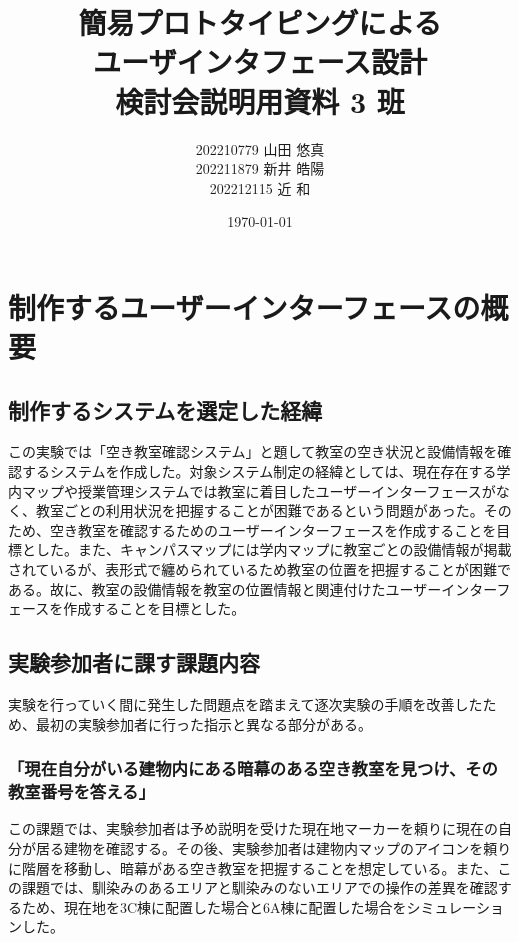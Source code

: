 \documentclass[12pt,a4paper,dvipdf]{jsarticle}
\title{簡易プロトタイピングによる\\ユーザインタフェース設計\\検討会説明用資料 3 班}
\author{202210779 山田 悠真\\202211879 新井 皓陽\\202212115 近 和}
\date{\today}
\begin{document}
\maketitle
\newpage


\section{制作するユーザーインターフェースの概要}
\subsection{制作するシステムを選定した経緯}
この実験では「空き教室確認システム」と題して教室の空き状況と設備情報を確認するシステムを作成した。対象システム制定の経緯としては、現在存在する学内マップや授業管理システムでは教室に着目したユーザーインターフェースがなく、教室ごとの利用状況を把握することが困難であるという問題があった。そのため、空き教室を確認するためのユーザーインターフェースを作成することを目標とした。また、キャンパスマップには学内マップに教室ごとの設備情報が掲載されているが、表形式で纏められているため教室の位置を把握することが困難である。故に、教室の設備情報を教室の位置情報と関連付けたユーザーインターフェースを作成することを目標とした。
\subsection{実験参加者に課す課題内容}
実験を行っていく間に発生した問題点を踏まえて逐次実験の手順を改善したため、最初の実験参加者に行った指示と異なる部分がある。
\subsubsection{「現在自分がいる建物内にある暗幕のある空き教室を見つけ、その教室番号を答える」}
この課題では、実験参加者は予め説明を受けた現在地マーカーを頼りに現在の自分が居る建物を確認する。その後、実験参加者は建物内マップのアイコンを頼りに階層を移動し、暗幕がある空き教室を把握することを想定している。また、この課題では、馴染みのあるエリアと馴染みのないエリアでの操作の差異を確認するため、現在地を3C棟に配置した場合と6A棟に配置した場合をシミュレーションした。
\end{document}
